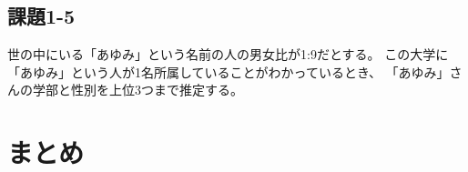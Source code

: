 \documentclass[12pt]{jarticle}
\begin{document}
\subsection{課題1-5}
\begin{shadebox}
    世の中にいる「あゆみ」という名前の人の男女比が1:9だとする。
    この大学に「あゆみ」という人が1名所属していることがわかっているとき、
    「あゆみ」さんの学部と性別を上位3つまで推定する。
\end{shadebox}

\section{まとめ}


\clearpage

\begin{thebibliography}{99}
    \label{sannkoubunnkenn_chapter}

\end{thebibliography}


\clearpage

\appendix

\end{document}
